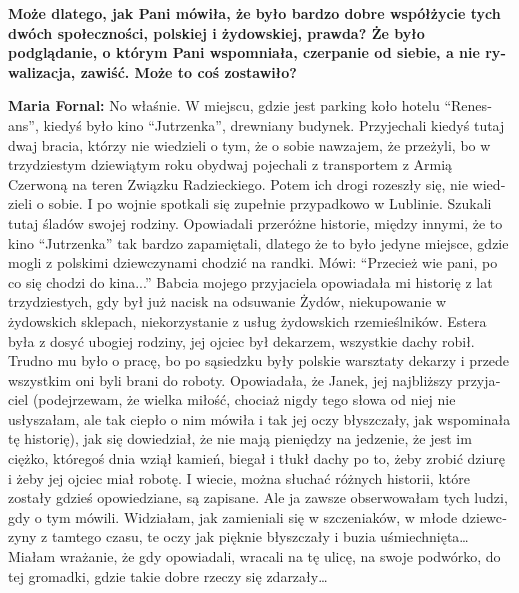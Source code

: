 \begin{otherlanguage}{ngerman}
\textbf{Może dlatego, jak Pani mówiła, że było bardzo dobre współżycie tych dwóch społeczności, polskiej i żydowskiej, prawda? Że było podglądanie, o którym Pani wspomniała, czerpanie od siebie, a nie rywalizacja, zawiść. Może to coś zostawiło?}

\textbf{Maria Fornal:} No właśnie. W miejscu, gdzie jest parking koło hotelu "`Renesans"', kiedyś było kino "`Jutrzenka"', drewniany budynek. Przyjechali kiedyś tutaj dwaj bracia, którzy nie wiedzieli o tym, że o sobie nawzajem, że przeżyli, bo w trzydziestym dziewiątym roku obydwaj pojechali z transportem z Armią Czerwoną na teren Związku Radzieckiego. Potem ich drogi rozeszły się, nie wiedzieli o sobie. I po wojnie spotkali się zupełnie przypadkowo w Lublinie. Szukali tutaj śladów swojej rodziny. Opowiadali przeróżne historie, między innymi, że to kino "`Jutrzenka"' tak bardzo zapamiętali, dlatego że to było jedyne miejsce, gdzie mogli z polskimi dziewczynami chodzić na randki. Mówi: "`Przecież wie pani, po co się chodzi do kina..."' Babcia mojego przyjaciela opowiadała mi historię z lat trzydziestych, gdy był już nacisk na odsuwanie Żydów, niekupowanie w żydowskich sklepach, niekorzystanie z usług żydowskich rzemieślników. Estera była z dosyć ubogiej rodziny, jej ojciec był dekarzem, wszystkie dachy robił. Trudno mu było o pracę, bo po sąsiedzku były polskie warsztaty dekarzy i przede wszystkim oni byli brani do roboty. Opowiadała, że Janek, jej najbliższy przyjaciel (podejrzewam, że wielka miłość, chociaż nigdy tego słowa od niej nie usłyszałam, ale tak ciepło o nim mówiła i tak jej oczy błyszczały, jak wspominała tę historię), jak się dowiedział, że nie mają pieniędzy na jedzenie, że jest im ciężko, któregoś dnia wziął kamień, biegał i tłukł dachy po to, żeby zrobić dziurę i żeby jej ojciec miał robotę. I wiecie, można słuchać różnych historii, które zostały gdzieś opowiedziane, są zapisane. Ale ja zawsze obserwowałam tych ludzi, gdy o tym mówili. Widziałam, jak zamieniali się w szczeniaków, w młode dziewczyny z tamtego czasu, te oczy jak pięknie błyszczały i buzia uśmiechnięta… Miałam wrażanie, że gdy opowiadali, wracali na tę ulicę, na swoje podwórko, do tej gromadki, gdzie takie dobre rzeczy się zdarzały… 
\end{otherlanguage}